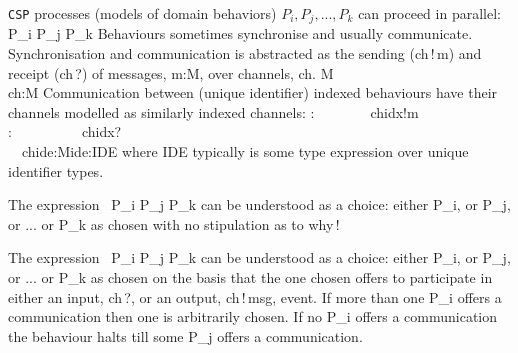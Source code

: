 \begynd
\pind \texttt{CSP} processes (models of domain behaviors) $P_i, P_j, ..., P_k$ can proceed in
      parallel:
\bp
\>\>\>\>P\_i {\PARL} P\_j {\PARL} {\DOTDOTDOT} {\PARL} P\_k
\ep
\pind Behaviours
\begynd
\pind sometimes synchronise 
\pind and usually communicate.
\afslut
\pos{\psno}{\mnewfoil}
\pind Synchronisation and communication is abstracted as 
\begynd
\pind the sending (\textsf{ch\,!\,m}) and 
\pind receipt (\textsf{ch\,?})
\pind of messages, \textsf{m:M}, 
\pind over channels, \textsf{ch}.
\afslut
\bp
\>\> M\\
\>\> ch:M
\ep
\pos{\psno}{\mnewfoil}
\pind Communication between (unique identifier) indexed behaviours \nyl
      have their channels modelled as similarly indexed channels:
\bp
\>\>:\ \ \ \ \ \ \ \ ch{\LBRACKET}idx{\RBRACKET}!m\\
\>\>:\ \ \ \ \ \ \ \ \ \ ch{\LBRACKET}idx{\RBRACKET}?\\
\>\>\ \ {\LBRACE}ch{\LBRACKET}ide{\RBRACKET}:M{\BAR}ide:IDE{\RBRACE}
\ep
    where \textsf{IDE} typically is some type expression \nyl over
    unique identifier types.
\afslut
\pos{\psno}{\mnewfoil}


\begynd
\pind The expression
\bp
\>\ P\_i {\NONDETCHOICE} P\_j {\NONDETCHOICE} {\DOTDOTDOT} {\NONDETCHOICE} P\_k
\ep
\begynd
\pind can be understood as a choice:
\pos{}{\bmcii}
\begynd
\pind either \textsf{P\_i}, 
\pind or \textsf{P\_j},
\pind or ...
\pind or \textsf{P\_k}
\afslut \pos{}{\emcii} as  chosen
\pind with no stipulation as to why\,!
\afslut
\afslut
\pos{\psno}{\mnewfoil}%


\begynd
\pind The expression
\bp
\>\ P\_i {\DETCHOICE} P\_j {\DETCHOICE} {\DOTDOTDOT} {\DETCHOICE} P\_k
\ep
\begynd
\pind can be understood as a choice:
\pos{}{\bmcii}
\begynd
\pind either \textsf{P\_i}, 
\pind or \textsf{P\_j},
\pind or ...
\pind or \textsf{P\_k}
\afslut \pos{}{\emcii} as  chosen
\pind on the basis that the one chosen offers to participate
      \pos{}{\\} in either an input, \textsf{ch\,?}, or an output,
      \textsf{ch\,!\,msg}, event.
\pind If more than one   \textsf{P\_i} offers a communication \pos{}{\\} then one
      is arbitrarily chosen.
\pind If no  \textsf{P\_i} offers a communication the behaviour halts \pos{}{\\} 
      till some  \textsf{P\_j} offers a communication.
\afslut
\afslut

